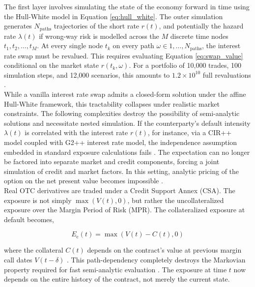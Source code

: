     \noindent
    The first layer involves simulating the state of the economy forward in time using the Hull-White model in Equation \ref{eq:hull_white}. The outer simulation generates $N_{\text{paths}}$ trajectories of the short rate $r(t)$, and potentially the hazard rate $\lambda(t)$ if wrong-way risk is modelled across the $M$ discrete time nodes ${t_1, t_2, \dots, t_M}$. At every single node $t_k$ on every path $\omega \in {1, \dots, N_{\text{paths}}}$, the interest rate swap must be revalued. This requires evaluating Equation \ref{eq:swap_value} conditional on the market state $r(t_k, \omega)$. For a portfolio of 10,000 trades, 100 simulation steps, and 12,000 scenarios, this amounts to $1.2 \times10 ^{10}$ full revaluations \cite{Green_2016}. \\

    \noindent
    While a vanilla interest rate swap admits a closed-form solution under the affine Hull-White framework, this tractability collapses under realistic market constraints. The following complexities destroy the possibility of semi-analytic solutions and necessitate nested simulation. If the counterparty's default intensity $\lambda(t)$ is correlated with the interest rate $r(t)$, for instance, via a CIR++ model coupled with G2++ interest rate model, the independence assumption embedded in standard exposure calculations fails \cite{brigo2013counterparty}. The expectation can no longer be factored into separate market and credit components, forcing a joint simulation of credit and market factors. In this setting, analytic pricing of the option on the net present value becomes impossible \cite{brigo2013counterparty}. \\

    \noindent 
    Real OTC derivatives are traded under a Credit Support Annex (CSA). The exposure is not simply $\max(V(t), 0)$, but rather the uncollateralized exposure over the Margin Period of Risk (MPR). The collateralized exposure at default becomes,

    \begin{equation}
        E_{\text{c}}(t) = \max(V(t) - C(t), 0)
        \label{eq:collateral}
    \end{equation}    

    \noindent
    where the collateral $C(t)$ depends on the contract's value at previous margin call dates $V(t - \delta)$ \cite{Gregory_2015}. This path-dependency completely destroys the Markovian property required for fast semi-analytic evaluation \cite{zhou2019practical}. The exposure at time $t$ now depends on the entire history of the contract, not merely the current state. \\

